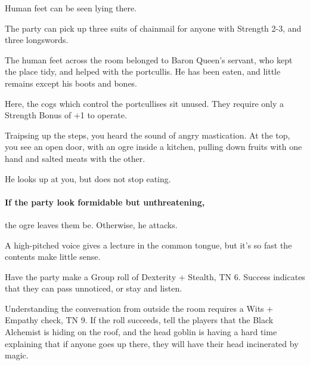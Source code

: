 \begin{multicols}{2}
\begin{boxtext}
	Human feet can be seen lying there.

\end{boxtext}

The party can pick up three suits of chainmail for anyone with Strength 2-3, and three longswords.

The human feet across the room belonged to Baron Queen's servant, who kept the place tidy, and helped with the portcullis.
He has been eaten, and little remains except his boots and bones.


Here, the cogs which control the portcullises sit unused.
They require only a Strength Bonus of +1 to operate.


\begin{boxtext}

	Traipsing up the steps, you heard the sound of angry mastication.
	At the top, you see an open door, with an ogre inside a kitchen, pulling down fruits with one hand and salted meats with the other.

	He looks up at you, but does not stop eating.

\end{boxtext}

\paragraph{If the party look formidable but unthreatening,}
the ogre leaves them be.
Otherwise, he attacks.



\begin{boxtext}

	A high-pitched voice gives a lecture in the common tongue, but it's so fast the contents make little sense.

\end{boxtext}

\noindent
Have the party make a Group roll of Dexterity + Stealth, TN 6.
Success indicates that they can pass unnoticed, or stay and listen.

Understanding the conversation from outside the room requires a Wits + Empathy check, TN 9.
If the roll succeeds, tell the players that the Black Alchemist is hiding on the roof, and the head goblin is having a hard time explaining that if anyone goes up there, they will have their head incinerated by magic.



\end{multicols}
